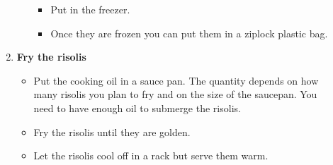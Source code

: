 \documentclass[11pt,letterpaper]{article}
\newcommand \fileName {Risolis}
\begin{document}
\begin{description}
\begin{enumerate}
\begin{itemize}
\begin{itemize}
		\item Put in the freezer.
		\item Once they are frozen you can put them in a ziplock plastic bag.
		\end{itemize}
	\end{itemize}
	\item {\bf Fry the risolis}
	\begin{itemize}
	\item Put the cooking oil in a sauce pan. The quantity depends on how many risolis you plan to fry and on the size of the saucepan. You need to have enough oil to submerge the risolis.
	\item Fry the risolis until they are golden. 
	\item Let the risolis cool off in a rack but serve them warm.
	\end{itemize}
	\end{enumerate}
\end{description}


\end{document}
